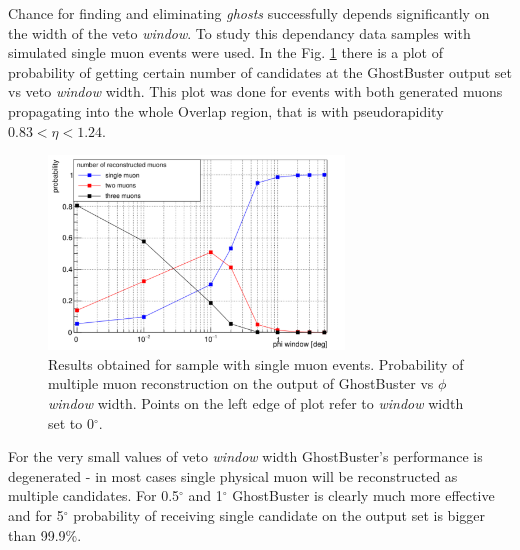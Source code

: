 Chance for finding and eliminating \textit{ghosts} successfully depends significantly on the width of the veto \textit{window}. To study this dependancy data samples with simulated single muon events were used. In the Fig. \ref{prob_vs_phi} there is a plot of probability of getting certain number of candidates at the GhostBuster output set vs veto \textit{window} width. This plot was done for events with both generated muons propagating into the whole Overlap region, that is with pseudorapidity $0.83 < \eta < 1.24$.
\begin{figure}[t]
\centering
\includegraphics[width=0.7\textwidth]{prob_phi.pdf}
\caption{Results obtained for sample with single muon events. Probability of multiple muon reconstruction on the output of GhostBuster vs $\phi$ \textit{window} width. Points on the left edge of plot refer to \textit{window} width set to 0$^\circ$. }
\label{prob_vs_phi}
\end{figure} 
For the very small values of veto \textit{window} width GhostBuster's performance is degenerated - in most cases single physical muon will be reconstructed as multiple candidates. For 0.5$^\circ$\textrm{ }and 1$^\circ$\textrm{ }GhostBuster is clearly much more effective and for 5$^\circ$\textrm{ }probability of receiving single candidate on the output set is bigger than 99.9\%. 

